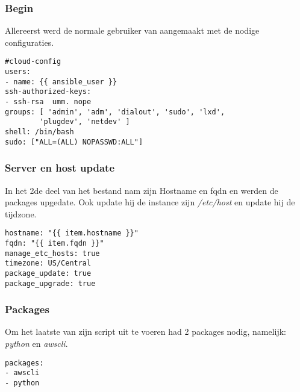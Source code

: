 \subsubsection{Begin}
Allereerst werd de normale gebruiker van \autocite{scottharney} aangemaakt met de nodige configuraties.

\begin{lstlisting}
#cloud-config
users:
- name: {{ ansible_user }}
ssh-authorized-keys:
- ssh-rsa  umm. nope
groups: [ 'admin', 'adm', 'dialout', 'sudo', 'lxd', 
		'plugdev', 'netdev' ]
shell: /bin/bash
sudo: ["ALL=(ALL) NOPASSWD:ALL"]
\end{lstlisting} 

\subsubsection{Server en host update}
In het 2de deel van het bestand nam \autocite{scottharney} zijn Hostname en fqdn en werden de packages upgedate. Ook update hij de instance zijn \textit{/etc/host} en update hij de tijdzone.

\begin{lstlisting}
hostname: "{{ item.hostname }}"
fqdn: "{{ item.fqdn }}"
manage_etc_hosts: true
timezone: US/Central
package_update: true
package_upgrade: true
\end{lstlisting} 

\subsubsection{Packages}
Om het laatste van zijn script uit te voeren had \autocite{scottharney} 2 packages nodig, namelijk: \textit{python} en \textit{awscli}. 

\begin{lstlisting}
packages:
- awscli
- python
\end{lstlisting}


